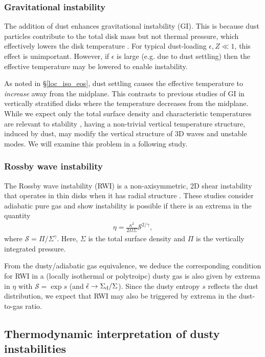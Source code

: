 
\subsubsection{Gravitational instability} %
The addition of dust enhances gravitational
instability (GI). This is because dust particles contribute to the
total disk mass but not thermal pressure, which effectively lowers the
disk temperature \citep[][]{thompson88}. For typical dust-loading
$\epsilon, Z\ll1$, this effect is unimportant. However, if $\epsilon$ is
large (e.g. due to dust settling) then the effective temperature may 
be lowered to enable instability. 

As noted in \S\ref{loc_iso_eos}, dust settling causes the effective
temperature to \emph{increase} away from the midplane. This contrasts
to previous studies of GI in vertically stratified disks
\citep[e.g.][]{mamat10, kim12,lin14c} where the temperature decreases
from the midplane. While we expect only the total surface density and
characteristic temperatures are relevant to stability 
\citep{toomre64}, having a non-trivial vertical temperature
structure, induced by dust, may modify the vertical structure of 3D
waves and unstable modes. We will examine this problem in a following
study.  




\subsubsection{Rossby wave instability}
The Rossby wave instability (RWI) is a non-axisymmetric, 2D shear
instability that operates in thin disks when it has radial structure
\citep{lovelace99,li00}. These studies consider adiabatic pure gas and 
show instability is possible if there is an extrema in the quantity
\begin{align}
 \eta = \frac{\kappa^2}{2\Omega\Sigma}\mathcal{S}^{2/\gamma},  
\end{align} 
where $\mathcal{S} = \Pi/\Sigma^\gamma$. Here, $\Sigma$ is the total
surface density and $\Pi$ is the vertically integrated pressure. 

From the dusty/adiabatic gas equivalence, we deduce the corresponding
condition for RWI in a (locally isothermal or polytroipc) dusty gas is
also given by extrema in $\eta$ with $\mathcal{S} = \exp{s}$ (and
$\tilde{\epsilon}\to \Sigma_\mathrm{d}/\Sigma$). Since
the dusty entropy $s$ reflects the dust distribution, we expect that
RWI may also be triggered by extrema in  the dust-to-gas ratio. 





\subsection{Thermodynamic interpretation of dusty instabilities}


